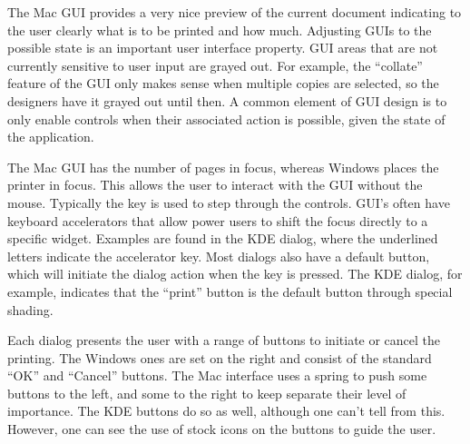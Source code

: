 The Mac GUI provides a very nice preview of the current document
indicating to the user clearly what is to be printed and how
much. Adjusting GUIs to the possible state is an important user
interface property.  GUI areas that are not currently sensitive to
user input are grayed out. For example, the ``collate'' feature of the
GUI only makes sense when multiple copies are selected, so the
designers have it grayed out until then. A common element of GUI
design is to only enable controls when their associated action is
possible, given the state of the application.

 
The Mac GUI has the number of pages in focus, whereas Windows places
the printer in focus. This allows the user to interact with the GUI
without the mouse. Typically the  key is used to step through
the controls. GUI's often have keyboard accelerators that allow power
users to shift the focus directly to a specific widget. Examples are
found in the KDE dialog, where the underlined letters indicate the
accelerator key. Most dialogs also have a default button, which will
initiate the dialog action when the  key is pressed. The
KDE dialog, for example, indicates that the ``print'' button is the
default button through special shading.




Each dialog presents the user with a range of buttons to initiate or
cancel the printing. The Windows ones are set on the right and consist
of the standard ``OK'' and ``Cancel'' buttons. The Mac interface uses
a spring to push some buttons to the left, and some to the right to
keep separate their level of importance. The KDE buttons do so as
well, although one can't tell from this. However, one can see the use
of stock icons on the buttons to guide the user. 

